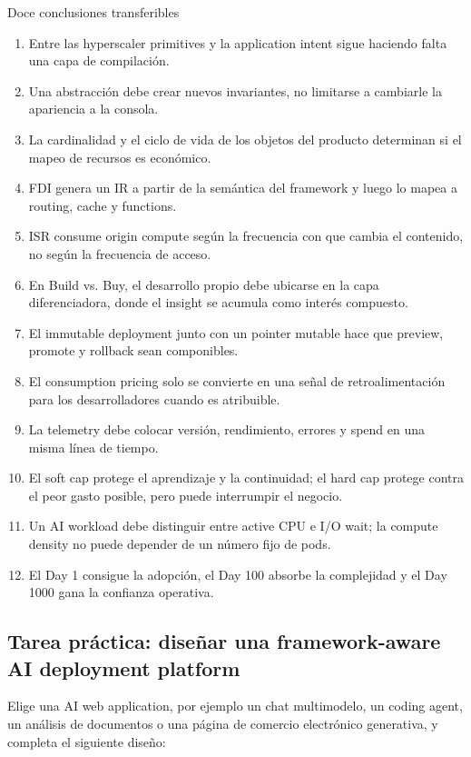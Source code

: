 \documentclass[a4paper]{article}
\begin{document}
\begin{importantbox}{Doce conclusiones transferibles}
\begin{enumerate}
  \item Entre las hyperscaler primitives y la application intent sigue haciendo falta una capa de compilación.
  \item Una abstracción debe crear nuevos invariantes, no limitarse a cambiarle la apariencia a la consola.
  \item La cardinalidad y el ciclo de vida de los objetos del producto determinan si el mapeo de recursos es económico.
  \item FDI genera un IR a partir de la semántica del framework y luego lo mapea a routing, cache y functions.
  \item ISR consume origin compute según la frecuencia con que cambia el contenido, no según la frecuencia de acceso.
  \item En Build vs. Buy, el desarrollo propio debe ubicarse en la capa diferenciadora, donde el insight se acumula como interés compuesto.
  \item El immutable deployment junto con un pointer mutable hace que preview, promote y rollback sean componibles.
  \item El consumption pricing solo se convierte en una señal de retroalimentación para los desarrolladores cuando es atribuible.
  \item La telemetry debe colocar versión, rendimiento, errores y spend en una misma línea de tiempo.
  \item El soft cap protege el aprendizaje y la continuidad; el hard cap protege contra el peor gasto posible, pero puede interrumpir el negocio.
  \item Un AI workload debe distinguir entre active CPU e I/O wait; la compute density no puede depender de un número fijo de pods.
  \item El Day 1 consigue la adopción, el Day 100 absorbe la complejidad y el Day 1000 gana la confianza operativa.
\end{enumerate}
\end{importantbox}

\subsection{Tarea práctica: diseñar una framework-aware AI deployment platform}

Elige una AI web application, por ejemplo un chat multimodelo, un coding agent, un análisis de documentos o una página de comercio electrónico generativa, y completa el siguiente diseño:
\end{document}
